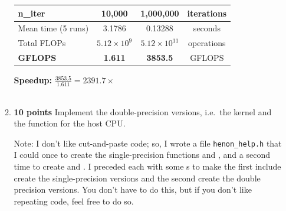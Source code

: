 \documentclass{article}
\newenvironment{answer}
{\par\color{blue}}
{\normalfont\par}
\begin{document}
\begin{enumerate}
\begin{enumerate}
\begin{answer}
\begin{center}
\begin{tabular}{|l|c|c|c|}
                                \hline
                                n\_iter                & 10,000               & 1,000,000             & iterations     \\
                                \hline
                                Mean time (5 runs)     & 3.1786               & 0.13288               & seconds        \\
                                \hline
                                Total FLOPs            & $5.12 \times 10^{9}$ & $5.12 \times 10^{11}$ & operations     \\
                                \hline
                                \textbf{GFLOPS}        & \textbf{1.611}       & \textbf{3853.5}       & GFLOPS         \\
                                \hline
                            \end{tabular}
                        \end{center}

                        \textbf{Speedup:} $\frac{3853.5}{1.611} = 2391.7\times$ \\ \\
                    \end{answer}

              \item \textbf{10 points}\label{q:recur.64}
                    Implement the double-precision versions, i.e.\ the  kernel and the  function
                    for the host CPU.
                    \par
                    Note: I don't like cut-and-paste code; so, I wrote a file \texttt{henon\_help.h} that I could 
                    once to create the single-precision functions  and , and a second time
                    to create  and .  I preceded each  with some s
                    to make the first include create the single-precision versions and the second create the double precision versions.
                    You don't have to do this, but if you don't like repeating code, feel free to do so.


\end{enumerate}
\end{enumerate}
\end{document}
